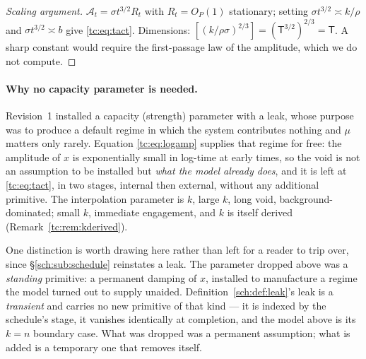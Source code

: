 \documentclass[11pt]{article}
\numberwithin{equation}{section}
\theoremstyle{plain}
\theoremstyle{definition}
\theoremstyle{remark}
\newcommand{\Ac}{\mathcal{A}}
\begin{document}
\begin{proof}[Scaling argument]
$\Ac_t=\sigma t^{3/2}R_t$ with $R_t=O_P(1)$ stationary; setting
$\sigma t^{3/2}\asymp k/\rho$ and $\sigma t^{3/2}\asymp b$ give
\eqref{tc:eq:tact}. Dimensions:
$[(k/\rho\sigma)^{2/3}]=(\mathsf T^{3/2})^{2/3}=\mathsf T$. A sharp
constant would require the first-passage law of the amplitude, which we
do not compute.
\end{proof}

\paragraph{Why no capacity parameter is needed.}\label{tc:rem:nocapacity}
Revision~1 installed a capacity (strength) parameter with a leak, whose
purpose was to produce a default regime in which the system contributes
nothing and $\mu$ matters only rarely. Equation \eqref{tc:eq:logamp}
supplies that regime for free: the amplitude of $x$ is exponentially
small in log-time at early times, so the void is not an assumption to be
installed but \emph{what the model already does}, and it is left at
\eqref{tc:eq:tact}, in two stages, internal then external, without
any additional primitive. The interpolation
parameter is $k$, large $k$, long void, background-dominated; small
$k$, immediate engagement, and $k$ is itself derived
(Remark~\ref{tc:rem:kderived}).

One distinction is worth drawing here rather than left for a reader to
trip over, since \S\ref{sch:sub:schedule} reinstates a leak. The
parameter dropped above was a \emph{standing} primitive: a permanent
damping of $x$, installed to manufacture a regime the model turned out to
supply unaided. Definition~\ref{sch:def:leak}'s leak is a \emph{transient}
and carries no new primitive of that kind --- it is indexed by the
schedule's stage, it vanishes identically at completion, and the model
above is its $k=n$ boundary case. What was dropped was a permanent
assumption; what is added is a temporary one that removes itself.
\end{document}
